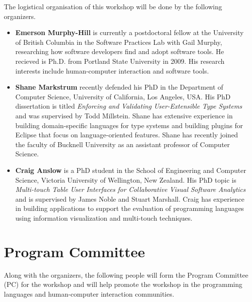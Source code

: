 \documentclass[authorpermission]{sigplanconf}
\begin{document}
The logistical organisation of this workshop will be done by the following organizers.

\begin{itemize}
\item \textbf{Emerson Murphy-Hill} is currently a
  postdoctoral fellow at the University of British Columbia in the
  Software Practices Lab with Gail Murphy, researching how 
  software developers find and adopt software tools.
  He recieved is Ph.D. from Portland State University in 2009.
  His research interests include human-computer interaction and software tools. 

\item \textbf{Shane Markstrum} recently defended his PhD in the
  Department of Computer Science, University of California, Los
  Angeles, USA. His PhD dissertation is titled \emph{Enforcing and
    Validating User-Extensible Type Systems} and was supervised by
  Todd Millstein. Shane has extensive experience in building
  domain-specific languages for type systems and building plugins for
  Eclipse that focus on language-oriented features. Shane has recently
  joined the faculty of Bucknell University as an assistant professor
  of Computer Science.  
  
\item \textbf{Craig Anslow} is a PhD student in the School of
  Engineering and Computer Science, Victoria University of Wellington,
  New Zealand. His PhD topic is \emph{Multi-touch Table User
    Interfaces for Collaborative Visual Software Analytics} and is
  supervised by James Noble and Stuart Marshall. Craig has experience
  in building applications to support the evaluation of programming
  languages using information visualization and multi-touch
  techniques.

\end{itemize}

\section{Program Committee}

Along with the organizers, the following people will form the Program
Committee (PC) for the workshop and will help promote the workshop in
the programming languages and human-computer interaction communities.
\end{document}

